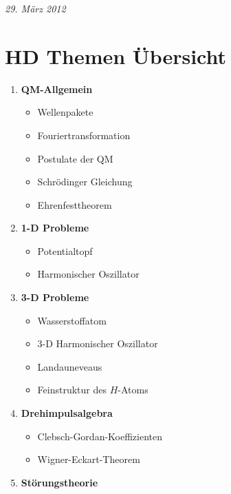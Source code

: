 



\textit{29. März 2012}


\section*{HD Themen Übersicht}

\begin{enumerate}
\item \textbf{QM-Allgemein}

  \begin{itemize}
  \item Wellenpakete
   \item Fouriertransformation
   \item Postulate der QM
   \item Schrödinger Gleichung
   \item Ehrenfesttheorem
  \end{itemize}

\item \textbf{1-D Probleme}

  \begin{itemize}
  \item Potentialtopf
   \item Harmonischer Oszillator
  \end{itemize}

\item \textbf{3-D Probleme}

  \begin{itemize}
  \item Wasserstoffatom
   \item 3-D Harmonischer Oszillator
   \item Landauneveaus
   \item Feinstruktur des \(H\)-Atoms
  \end{itemize}


\item \textbf{Drehimpulsalgebra}

  \begin{itemize}
  \item Clebsch-Gordan-Koeffizienten
   \item Wigner-Eckart-Theorem
  \end{itemize}


\item \textbf{Störungstheorie}


\end{enumerate}
